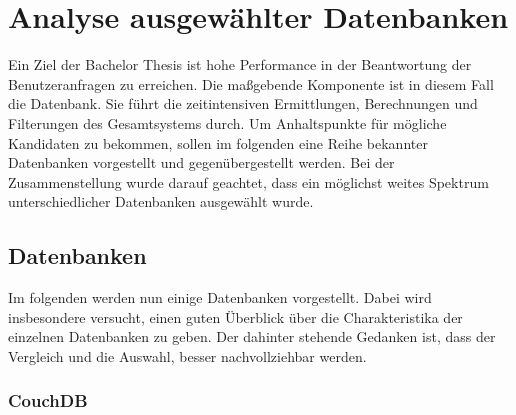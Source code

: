 \chapter{Analyse ausgewählter Datenbanken}
\label{ch:AnalyseDatenbanken}

Ein Ziel der Bachelor Thesis ist hohe Performance in der Beantwortung der Benutzeranfragen zu erreichen. Die maßgebende Komponente ist in diesem Fall die Datenbank. Sie führt die zeitintensiven Ermittlungen, Berechnungen und Filterungen des Gesamtsystems durch. Um Anhaltspunkte für mögliche Kandidaten zu bekommen, sollen im folgenden eine Reihe bekannter Datenbanken vorgestellt und gegenübergestellt werden. Bei der Zusammenstellung wurde darauf geachtet, dass ein möglichst weites Spektrum unterschiedlicher Datenbanken ausgewählt wurde.

\section{Datenbanken}
\label{ch:AnalyseDatenbanken:sec:Datenbanken}

Im folgenden werden nun einige Datenbanken vorgestellt. Dabei wird insbesondere versucht, einen guten Überblick über die Charakteristika der einzelnen Datenbanken zu geben. Der dahinter stehende Gedanken ist, dass der Vergleich und die Auswahl, besser nachvollziehbar werden. 

\subsection{CouchDB}
\label{ch:AnalyseDatenbanken:sec:Datenbanken:subsec:CouchDB}

